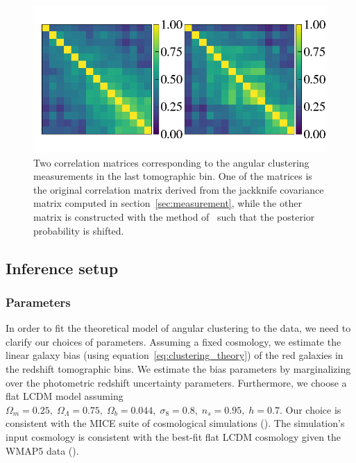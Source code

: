 \documentclass{aa}
\numberwithin{equation}{section}
\begin{document}
{\begin{figure}
\includegraphics[width=\textwidth]{figures_tmp/correlation_last_bin_cosmo.png}
\caption{ Two correlation matrices corresponding to the angular clustering measurements in the last tomographic bin. One of the matrices is the original correlation matrix derived from the jackknife covariance matrix computed in section~\ref{sec:measurement}, while the other matrix is constructed with the method of~\citet{sellentin2019} such that the posterior probability is shifted.} 
\label{fig:blind}
\end{figure}

\subsection{Inference setup}\label{sec:inference}

\subsubsection{Parameters}

In order to fit the theoretical model of angular clustering to the data, we need to clarify our choices of parameters. Assuming a fixed cosmology, we estimate the linear galaxy bias (using equation~\ref{eq:clustering_theory}) of the red galaxies in the redshift tomographic bins. We estimate the bias parameters by marginalizing over the photometric redshift uncertainty parameters.  
Furthermore, we choose a flat LCDM model assuming $\Omega_m = 0.25, \;\Omega_{\Lambda} = 0.75, \; \Omega_b = 0.044, \; \sigma_{8} = 0.8, \; n_s = 0.95, \; h = 0.7$. Our choice is consistent with the MICE suite of cosmological simulations (\citealt{MICE1}). The simulation's input cosmology is consistent with the best-fit flat LCDM cosmology given the WMAP5 data (\citealt{WMAP5}). 


}
\end{document}
